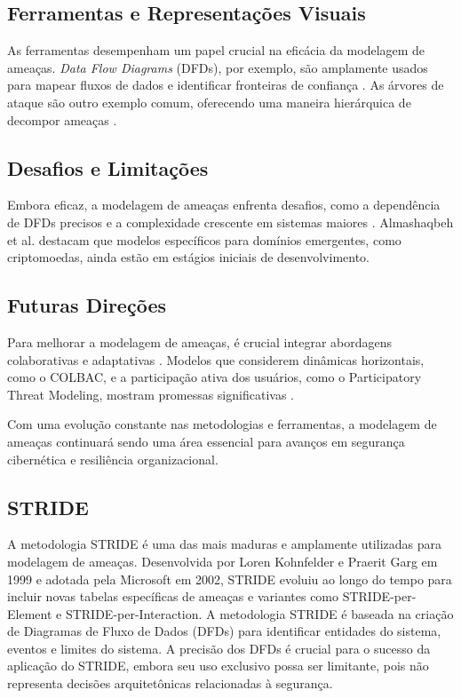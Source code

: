 \subsection{Ferramentas e Representações Visuais}

As ferramentas desempenham um papel crucial na eficácia da modelagem de ameaças.
\textit{Data Flow Diagrams} (DFDs), por exemplo, são amplamente usados para
mapear fluxos de dados e identificar fronteiras de confiança
\cite{ThreatModelingASummaryOfAvailableMethods}. As árvores de ataque são outro
exemplo comum, oferecendo uma maneira hierárquica de decompor ameaças
\cite{ThreatModellingSurvey}.

\subsection{Desafios e Limitações}

Embora eficaz, a modelagem de ameaças enfrenta desafios, como a dependência de
DFDs precisos e a complexidade crescente em sistemas maiores
\cite{ThreatModelingASummaryOfAvailableMethods}. Almashaqbeh et al.
\cite{AbcCrypto} destacam que modelos específicos para domínios emergentes, como
criptomoedas, ainda estão em estágios iniciais de desenvolvimento.

\subsection{Futuras Direções}

Para melhorar a modelagem de ameaças, é crucial integrar abordagens
colaborativas e adaptativas \cite{CoReTM}. Modelos que considerem dinâmicas
horizontais, como o COLBAC, e a participação ativa dos usuários, como o
Participatory Threat Modeling, mostram promessas significativas
\cite{Colbac,ParticipatoryThreatModelling}.

Com uma evolução constante nas metodologias e ferramentas, a modelagem de
ameaças continuará sendo uma área essencial para avanços em segurança
cibernética e resiliência organizacional.



\subsection{STRIDE}
\label{sec:STRIDE}

A metodologia STRIDE é uma das mais maduras e amplamente utilizadas para
modelagem de ameaças. Desenvolvida por Loren Kohnfelder e Praerit Garg em 1999 e adotada
pela Microsoft em 2002, STRIDE evoluiu ao longo do tempo para incluir novas tabelas
específicas de ameaças e variantes como STRIDE-per-Element e STRIDE-per-Interaction.
A metodologia STRIDE é baseada na criação de Diagramas de Fluxo de Dados
(DFDs) para identificar entidades do sistema, eventos e limites do sistema. A
precisão dos DFDs é crucial para o sucesso da aplicação do STRIDE, embora seu uso
exclusivo possa ser limitante, pois não representa decisões arquitetônicas relacionadas
à segurança. 

